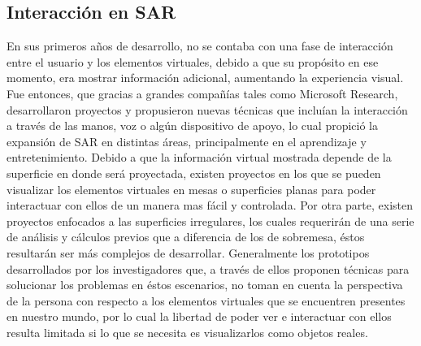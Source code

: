 \documentclass[a4paper,openright,12pt]{report}
\begin{document}
\subsection{Interacción en SAR}
En sus primeros años de desarrollo, no se contaba con una fase de interacción entre el usuario y los elementos virtuales, debido a que su propósito en ese momento, era mostrar información adicional, aumentando la experiencia visual. Fue entonces, que gracias a grandes compañías tales como Microsoft Research\textregistered, desarrollaron proyectos y propusieron nuevas técnicas que incluían la interacción a través de las manos, voz o algún dispositivo de apoyo, lo cual propició la expansión de SAR en distintas áreas, principalmente en el aprendizaje y entretenimiento. Debido a que la información virtual mostrada depende de la superficie en donde será proyectada, existen proyectos en los que se pueden visualizar los elementos virtuales en mesas o superficies planas para poder interactuar con ellos de un manera mas fácil y controlada. Por otra parte, existen proyectos enfocados a las superficies irregulares, los cuales requerirán de una serie de análisis y cálculos previos que a diferencia de los de sobremesa, éstos resultarán ser más complejos de desarrollar. Generalmente los prototipos desarrollados por los investigadores que, a través de ellos proponen técnicas para solucionar los problemas en éstos escenarios, no toman en cuenta la perspectiva de la persona con respecto a los elementos virtuales que se encuentren presentes en nuestro mundo, por lo cual la libertad de poder ver e interactuar con ellos resulta limitada si lo que se necesita es visualizarlos como objetos reales.\\
\end{document}
